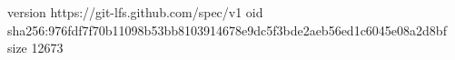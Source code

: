 version https://git-lfs.github.com/spec/v1
oid sha256:976fdf7f70b11098b53bb8103914678e9dc5f3bde2aeb56ed1c6045e08a2d8bf
size 12673
